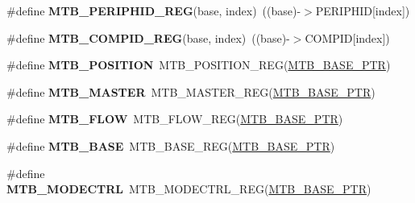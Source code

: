 \begin{DoxyCompactItemize}
\#define {\bfseries M\+T\+B\+\_\+\+P\+E\+R\+I\+P\+H\+I\+D\+\_\+\+R\+EG}(base,  index)~((base)-\/$>$P\+E\+R\+I\+P\+H\+ID\mbox{[}index\mbox{]})
\item 
\mbox{\label{group___m_t_b___register___accessor___macros_gaac63d251aca1f616d48a106b19ec2504}} 
\#define {\bfseries M\+T\+B\+\_\+\+C\+O\+M\+P\+I\+D\+\_\+\+R\+EG}(base,  index)~((base)-\/$>$C\+O\+M\+P\+ID\mbox{[}index\mbox{]})
\item 
\mbox{\label{group___m_t_b___register___accessor___macros_ga2356017c5dd8a963f2566b41cdb0e2ea}} 
\#define {\bfseries M\+T\+B\+\_\+\+P\+O\+S\+I\+T\+I\+ON}~M\+T\+B\+\_\+\+P\+O\+S\+I\+T\+I\+O\+N\+\_\+\+R\+EG(\hyperlink{group___m_t_b___peripheral_gadf7f362dfa67354951e6a23ddf08cd73}{M\+T\+B\+\_\+\+B\+A\+S\+E\+\_\+\+P\+TR})
\item 
\mbox{\label{group___m_t_b___register___accessor___macros_ga8790f019f8279bebf92068c9f295280f}} 
\#define {\bfseries M\+T\+B\+\_\+\+M\+A\+S\+T\+ER}~M\+T\+B\+\_\+\+M\+A\+S\+T\+E\+R\+\_\+\+R\+EG(\hyperlink{group___m_t_b___peripheral_gadf7f362dfa67354951e6a23ddf08cd73}{M\+T\+B\+\_\+\+B\+A\+S\+E\+\_\+\+P\+TR})
\item 
\mbox{\label{group___m_t_b___register___accessor___macros_ga9841006af8717076e984b80b1cfc2952}} 
\#define {\bfseries M\+T\+B\+\_\+\+F\+L\+OW}~M\+T\+B\+\_\+\+F\+L\+O\+W\+\_\+\+R\+EG(\hyperlink{group___m_t_b___peripheral_gadf7f362dfa67354951e6a23ddf08cd73}{M\+T\+B\+\_\+\+B\+A\+S\+E\+\_\+\+P\+TR})
\item 
\mbox{\label{group___m_t_b___register___accessor___macros_ga64ea285c9775d03c2ab9d9194ad9c65c}} 
\#define {\bfseries M\+T\+B\+\_\+\+B\+A\+SE}~M\+T\+B\+\_\+\+B\+A\+S\+E\+\_\+\+R\+EG(\hyperlink{group___m_t_b___peripheral_gadf7f362dfa67354951e6a23ddf08cd73}{M\+T\+B\+\_\+\+B\+A\+S\+E\+\_\+\+P\+TR})
\item 
\mbox{\label{group___m_t_b___register___accessor___macros_ga00d4027aa9de57d1d216ae2331dfb623}} 
\#define {\bfseries M\+T\+B\+\_\+\+M\+O\+D\+E\+C\+T\+RL}~M\+T\+B\+\_\+\+M\+O\+D\+E\+C\+T\+R\+L\+\_\+\+R\+EG(\hyperlink{group___m_t_b___peripheral_gadf7f362dfa67354951e6a23ddf08cd73}{M\+T\+B\+\_\+\+B\+A\+S\+E\+\_\+\+P\+TR})

\end{DoxyCompactItemize}
